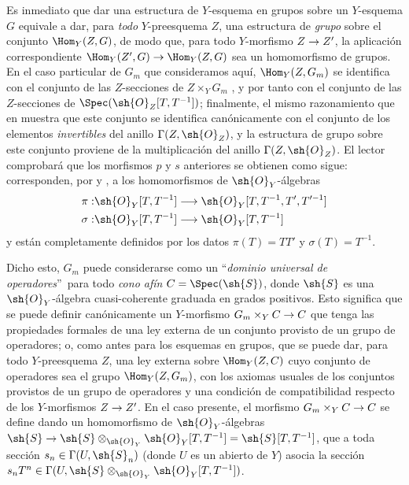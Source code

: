 \documentclass[oneside,10pt]{amsart}
\makeatletter
\newcommand{\ega@arrow}[2]{\mathchoice{#1}{#2}{#2}{#2}}
\renewcommand{\to}{\ega@arrow{\longrightarrow}{\rightarrow}}
\newcommand{\oldpage}[2][]{\marginnote{\normalfont\footnotesize\textbf{#1}~|~#2}\ignorespaces}
\makeatother
\begin{document}
\begin{remark}[8.3.9]
\oldpage[II]{167}
Es inmediato  que dar una estructura de $Y$-esquema en grupos sobre un $Y$-esquema $G$ equivale a dar, para \emph{todo} $Y$-preesquema $Z$, una estructura de \emph{grupo} sobre el conjunto $\Hom_Y(Z,G)$, de modo que, para todo $Y$-morfismo $Z\to Z'$, la aplicación correspondiente $\Hom_Y(Z',G)\to\Hom_Y(Z,G)$ sea un homomorfismo de grupos.
En el caso particular de $G_m$ que consideramos aquí, $\Hom_Y(Z,G_m)$ se identifica con el conjunto de las $Z$-secciones de $Z\times_Y G_m$ , y por tanto con el conjunto de las $Z$-secciones de $\Spec(\sh{O}_Z[T,T^{-1}])$;
finalmente, el mismo razonamiento que en  muestra que este conjunto se identifica canónicamente con el conjunto de los elementos \emph{invertibles} del anillo $\Gamma(Z,\sh{O}_Z)$, y la estructura de grupo sobre este conjunto proviene de la multiplicación del anillo $\Gamma(Z,\sh{O}_Z)$.
El lector comprobará que los morfismos $p$ y $s$ anteriores se obtienen como sigue: corresponden, por  y , a los homomorfismos de $\sh{O}_Y$-álgebras
\begin{align*}
  \pi: &\sh{O}_Y[T,T^{-1}] \to \sh{O}_Y[T,T^{-1},T',T'^{-1}]
\\\sigma: &\sh{O}_Y[T,T^{-1}] \to \sh{O}_Y[T,T^{-1}]
\end{align*}
y están completamente definidos por los datos $\pi(T)=TT'$ y $\sigma(T)=T^{-1}$.

Dicho esto, $G_m$ puede considerarse como un \textquotedblleft\emph{dominio universal de operadores}\textquotedblright\ para todo \emph{cono afín} $C=\Spec(\sh{S})$, donde $\sh{S}$ es una $\sh{O}_Y$-álgebra cuasi-coherente graduada en grados positivos.
Esto significa que se puede definir canónicamente un $Y$-morfismo $G_m\times_Y C\to C$ que tenga las propiedades formales de una ley externa de un conjunto provisto de un grupo de operadores;
o, como antes para los esquemas en grupos, que se puede dar, para todo $Y$-preesquema $Z$, una ley externa sobre $\Hom_Y(Z,C)$ cuyo conjunto de operadores sea el grupo $\Hom_Y(Z,G_m)$, con los axiomas usuales de los conjuntos provistos de un grupo de operadores y una condición de compatibilidad respecto de los $Y$-morfismos $Z\to Z'$.
En el caso presente, el morfismo $G_m\times_Y C\to C$ se define dando un homomorfismo de $\sh{O}_Y$-álgebras $\sh{S} \to \sh{S}\otimes_{\sh{O}_Y}\sh{O}_Y[T,T^{-1}] = \sh{S}[T,T^{-1}]$, que a toda sección $s_n\in\Gamma(U,\sh{S}_n)$ (donde $U$ es un abierto de $Y$) asocia la sección $s_n T^n\in\Gamma(U,\sh{S}\otimes_{\sh{O}_Y}\sh{O}_Y[T,T^{-1}])$.


\end{remark}
\end{document}
